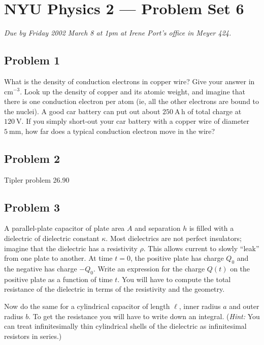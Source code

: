\documentclass{article}
\begin{document}
\thispagestyle{empty}
\section*{NYU Physics 2 --- Problem Set 6}

\emph{Due by Friday 2002 March 8 at 1pm at Irene Port's office in
Meyer 424.}

\subsection*{Problem 1}

What is the density of conduction electrons in copper wire?  Give your
answer in $\mathrm{cm^{-3}}$.  Look up the density of copper and its
atomic weight, and imagine that there is one conduction electron per
atom (ie, all the other electrons are bound to the nuclei).  A good
car battery can put out about $250~\mathrm{A\,h}$ of total charge at
$120~\mathrm{V}$.  If you simply short-out your car battery with a
copper wire of diameter $5~\mathrm{mm}$, how far does a typical
conduction electron move in the wire?

\subsection*{Problem 2}

Tipler problem 26.90

\subsection*{Problem 3}

A parallel-plate capacitor of plate area $A$ and separation $h$ is
filled with a dielectric of dielectric constant $\kappa$.  Most
dielectrics are not perfect insulators; imagine that the dielectric
has a resistivity $\rho$.  This allows current to slowly ``leak'' from
one plate to another.  At time $t=0$, the positive plate has charge
$Q_0$ and the negative has charge $-Q_0$.  Write an expression for the
charge $Q(t)$ on the positive plate as a function of time $t$.  You
will have to compute the total resistance of the dielectric in terms
of the resistivity and the geometry.

Now do the same for a cylindrical capacitor of length $\ell$, inner
radius $a$ and outer radius $b$.  To get the resistance you will have
to write down an integral.  (\emph{Hint:} You can treat
infinitesimally thin cylindrical shells of the dielectric as
infinitesimal resistors in series.)
\end{document}
